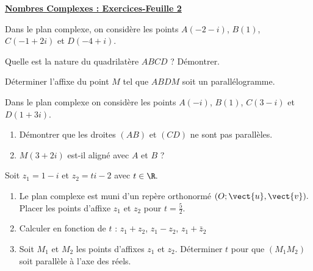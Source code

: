 \documentclass[a4paper,12pt]{article}
\renewcommand{\monlien}[2]{}
\begin{document}
\newpage

\underline{\bf\Large Nombres Complexes : Exercices-Feuille 2}



\setcounter{EXOno}{0}

\begin{frame}


\vspace{.5cm}
\EXO

Dans le plan complexe, on consid\`ere les points $A(-2-i)$, $B(1)$, $C(-1+2i)$ et $D(-4+i)$.



Quelle est la nature du quadrilat\`ere $ABCD$ ? D\'emontrer.

Déterminer l'affixe du point $M$ tel que $ABDM$ soit un parallélogramme.

\vspace{.2cm}
\EXO
Dans le plan complexe on consid\`ere les points $A(-i)$, $B(1)$, $C(3-i)$ et $D(1+3i)$.
\begin{enumerate}
 \item D\'emontrer que les droites $(AB)$ et $(CD)$ ne sont pas parall\`eles.
 \item $M(3+2i)$ est-il align\'e avec $A$ et $B$ ?
\end{enumerate}



\EXO 

Soit $z_1=1-i$ et $z_2=ti-2$ avec $t\in \R.$
\begin{enumerate}
\item Le plan complexe est muni d'un rep\`ere orthonorm\'e $(O;\vect{u},\vect{v}).$ Placer les points d'affixe $z_1$ et $z_2$ pour $t=\frac{5}{2}.$
\item Calculer en fonction de $t$ : $z_1+z_2$, $z_1-z_2$, $z_1+\bar{z}_2$
\item Soit $M_1$ et $M_2$ les points d'affixes $z_1$ et $z_2$. D\'eterminer $t$ pour que
$(M_1M_2)$ soit parall\`ele \`a l'axe des r\'eels.
\end{enumerate}

\monlien{sousgeom}{\monbouton{Retour cours}}
\end{frame}
\end{document}

